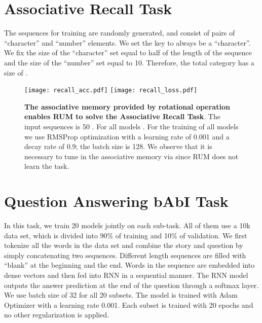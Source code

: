 \documentclass{article} \usepackage{iclr2018_conference,times}
\begin{document}
\section{Associative Recall Task} \label{app:sec:recall}
The sequences for training are randomly generated, and consist of pairs of ``character'' and ``number'' elements. We set the key to always be a ``character''. We fix the size of the ``character'' set equal to half of the length of the sequence and the size of the ``number'' set equal to 10. Therefore, the total category has a size of .

\begin{figure}[h!]
\centering
\texttt{[image: recall\_acc.pdf]}
\texttt{[image: recall\_loss.pdf]}
\caption{\textbf{The associative memory provided by rotational operation  enables RUM to solve the Associative Recall Task}. The input sequences is 50 . For all models . For the training of all models we use RMSProp optimization with a learning rate of 0.001 and a decay rate of 0.9; the batch size  is 128. We observe that it is necessary to tune in the associative memory via  since  RUM does not learn the task. 
}
\label{main:fig:recall}
\end{figure}


\section{Question Answering bAbI Task} \label{app:sec:babi}

In this task, we train 20 models jointly on each sub-task. All of them use a 10k data set, which is divided into 90\% of training and 10\% of validation. We first tokenize all the words in the data set and combine the story and question by simply concatenating two sequences. Different length sequences are filled with ``blank'' at the beginning and the end. Words in the sequence are embedded into dense vectors and then fed into RNN in a sequential manner. The RNN model outputs the answer prediction at the end of the question through a softmax layer. 
We use batch size of 32 for all 20 subsets. The model is trained with Adam Optimizer with a learning rate 0.001. Each subset is trained with 20 epochs and no other regularization is applied. 
\end{document}

